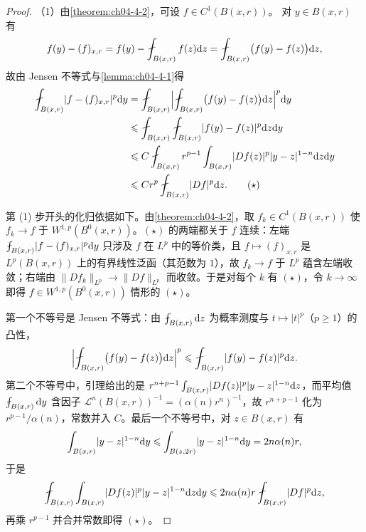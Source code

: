 \documentclass[../../main.tex]{subfiles}%
\begin{document}
\begin{proof}
（1）由\cref{theorem:ch04-4-2}，可设 $f\in C^1(B(x,r))$。%
对 $y\in B(x,r)$ 有
\begin{align*}
f(y)-(f)_{x,r}=f(y)-\fint_{B(x,r)}f(z)\diff z=\fint_{B(x,r)}\bigl(f(y)-f(z)\bigr)\diff z,
\end{align*}
故由 Jensen 不等式与\cref{lemma:ch04-4-1}得%
\begin{align*}
\fint_{B(x,r)}\lvert f-(f)_{x,r}\rvert^{p}\diff y
&=\fint_{B(x,r)}\Bigl\lvert\fint_{B(x,r)}\bigl(f(y)-f(z)\bigr)\diff z\Bigr\rvert^{p}\diff y\\
&\leqslant\fint_{B(x,r)}\fint_{B(x,r)}\lvert f(y)-f(z)\rvert^{p}\diff z\diff y\\
&\leqslant C\fint_{B(x,r)}r^{p-1}\int_{B(x,r)}\lvert Df(z)\rvert^{p}\lvert y-z\rvert^{1-n}\diff z\diff y\\
&\leqslant C r^{p}\fint_{B(x,r)}\lvert Df\rvert^{p}\diff z .\qquad(\star)
\end{align*}

第 (1) 步开头的化归依据如下。由\cref{theorem:ch04-4-2}，取 $f_k\in C^1(B(x,r))$ 使 $f_k\to f$ 于 $W^{1,p}(B^{0}(x,r))$。$(\star)$ 的两端都关于 $f$ 连续：左端 $\fint_{B(x,r)}\lvert f-(f)_{x,r}\rvert^{p}\diff y$ 只涉及 $f$ 在 $L^{p}$ 中的等价类，且 $f\mapsto(f)_{x,r}$ 是 $L^{p}(B(x,r))$ 上的有界线性泛函（其范数为 $1$），故 $f_k\to f$ 于 $L^{p}$ 蕴含左端收敛；右端由 $\lVert Df_k\rVert_{L^{p}}\to\lVert Df\rVert_{L^{p}}$ 而收敛。于是对每个 $k$ 有 $(\star)$，令 $k\to\infty$ 即得 $f\in W^{1,p}(B^{0}(x,r))$ 情形的 $(\star)$。%

第一个不等号是 Jensen 不等式：由 $\fint_{B(x,r)}\diff z$ 为概率测度与 $t\mapsto\lvert t\rvert^{p}$（$p\geqslant1$）的凸性，
\begin{align*}
\Bigl\lvert\fint_{B(x,r)}\bigl(f(y)-f(z)\bigr)\diff z\Bigr\rvert^{p}\leqslant\fint_{B(x,r)}\lvert f(y)-f(z)\rvert^{p}\diff z .
\end{align*}
第二个不等号中，引理给出的是 $r^{n+p-1}\int_{B(x,r)}\lvert Df(z)\rvert^{p}\lvert y-z\rvert^{1-n}\mathrm{d} z$，而平均值 $\fint_{B(x,r)}\diff y$ 含因子 $\mathcal{L}^{n}(B(x,r))^{-1}=(\alpha(n)r^{n})^{-1}$，故 $r^{n+p-1}$ 化为 $r^{p-1}/\alpha(n)$，常数并入 $C$。最后一个不等号中，对 $z\in B(x,r)$ 有
\begin{align*}
\int_{B(x,r)}\lvert y-z\rvert^{1-n}\mathrm{d} y\leqslant\int_{B(z,2r)}\lvert y-z\rvert^{1-n}\mathrm{d} y=2n\alpha(n)r,
\end{align*}
于是
\begin{align*}
\fint_{B(x,r)}\int_{B(x,r)}\lvert Df(z)\rvert^{p}\lvert y-z\rvert^{1-n}\diff z\diff y\leqslant 2n\alpha(n)r\fint_{B(x,r)}\lvert Df\rvert^{p}\diff z,
\end{align*}
再乘 $r^{p-1}$ 并合并常数即得 $(\star)$。


\end{proof}
\end{document}
